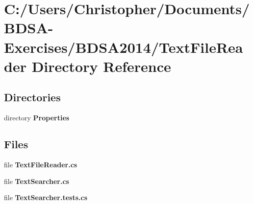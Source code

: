\section{C\+:/\+Users/\+Christopher/\+Documents/\+B\+D\+S\+A-\/\+Exercises/\+B\+D\+S\+A2014/\+Text\+File\+Reader Directory Reference}
\label{dir_3937b4f0d77f871d4927eb6db2a1831a}
\subsection*{Directories}
\begin{DoxyCompactItemize}
\item 
directory {\bf Properties}
\end{DoxyCompactItemize}
\subsection*{Files}
\begin{DoxyCompactItemize}
\item 
file {\bfseries Text\+File\+Reader.\+cs}
\item 
file {\bfseries Text\+Searcher.\+cs}
\item 
file {\bfseries Text\+Searcher.\+tests.\+cs}
\end{DoxyCompactItemize}
